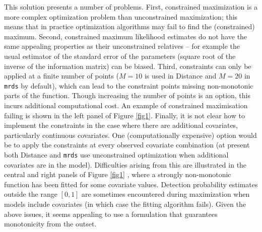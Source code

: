 \documentclass[useAMS,referee,usenatbib]{biom}
\begin{document}
This solution presents a number of problems. First, constrained maximization is a more complex optimization problem than unconstrained maximization; this means that in practice optimization algorithms may fail to find the (constrained) maximum.  Second, constrained maximum likelihood estimates do not have the same appealing properties as their unconstrained relatives -- for example the usual estimator of the standard error of the parameters (square root of the inverse of the information matrix) can be biased.  Third, constraints can only be applied at a finite number of points ($M=10$ is used in Distance and $M=20$ in \texttt{mrds} by default), which can lead to the constraint points missing non-monotonic parts of the function. Though increasing the number of points is an option, this incurs additional computational cost. An example of constrained maximisation failing is shown in the left panel of Figure \ref{fig1}. Finally, it is not clear how to implement the constraints in the case where there are additional covariates, particularly continuous covariates. One (computationally expensive) option would be to apply the constraints at every observed covariate combination (at present both Distance and \texttt{mrds} use unconstrained optimization when additional covariates are in the model). Difficulties arising from this are illustrated in the central and right panels of Figure \ref{fig1} \citep[from][]{Pike:2003ug}, where a strongly non-monotonic function has been fitted for some covariate values. Detection probability estimates outside the range $[0,1]$ are sometimes encountered during maximization when models include covariates (in which case the fitting algorithm fails). Given the above issues, it seems appealing to use a formulation that guarantees monotonicity from the outset.
\end{document}
